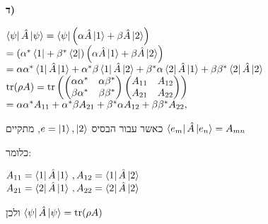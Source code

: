 \documentclass[14pt]{extarticle}
\makeatletter
\newenvironment{lefteqs}{%
    \begin{english}%
    \begin{flushleft}%
    \renewcommand{\arraystretch}{1.3}%
    $\begin{array}{@{}l@{}}%
}{%
    \end{array}$%
    \end{flushleft}%
    \end{english}%
}
\makeatother
\begin{document}
\textbf{ד)}

\begin{lefteqs}
    \bra{\psi}\hat A\ket{\psi}
    =
    \bra{\psi}
    \left(
    \alpha \hat A\ket{1}
    +
    \beta \hat A\ket{2}
    \right) \\
    =
    \left(
    \alpha^*\bra{1}
    +
    \beta^*\bra{2}
    \right)
    \left(
    \alpha \hat A\ket{1}
    +
    \beta \hat A\ket{2}
    \right)\\
    =
    \alpha\alpha^*\bra{1}\hat A\ket{1}
    +
    \alpha^*\beta\bra{1}\hat A\ket{2}
    +
    \beta^*\alpha\bra{2}\hat A\ket{1}
    +
    \beta\beta^*\bra{2}\hat A\ket{2}\\
    \operatorname{tr}(\rho A)
    =
    \operatorname{tr}
    \left(
    \begin{pmatrix}
    \alpha\alpha^* & \alpha\beta^* \\
    \beta\alpha^* & \beta\beta^*
    \end{pmatrix}
    \begin{pmatrix}
    A_{11} & A_{12} \\
    A_{21} & A_{22}
    \end{pmatrix}
    \right)\\
    =
    \alpha\alpha^* A_{11}
    +
    \alpha^*\beta A_{21}
    +
    \beta^*\alpha A_{12}
    +
    \beta\beta^* A_{22},
\end{lefteqs}

כאשר עבור הבסיס $e={\ket{1},\ket{2}}$, מתקיים $\bra{e_m} \hat{A} \ket{e_n} = A_{mn}$

כלומר:

\begin{lefteqs}
    A_{11} = \bra{1}\hat A\ket{1} \, , A_{12} = \bra{1}\hat A\ket{2} \\
    A_{21} = \bra{2}\hat A\ket{1} \, , A_{22} = \bra{2}\hat A\ket{2}
\end{lefteqs}

ולכן $\bra{\psi}\hat A\ket{\psi} = \operatorname{tr}(\rho A)$
\end{document}
